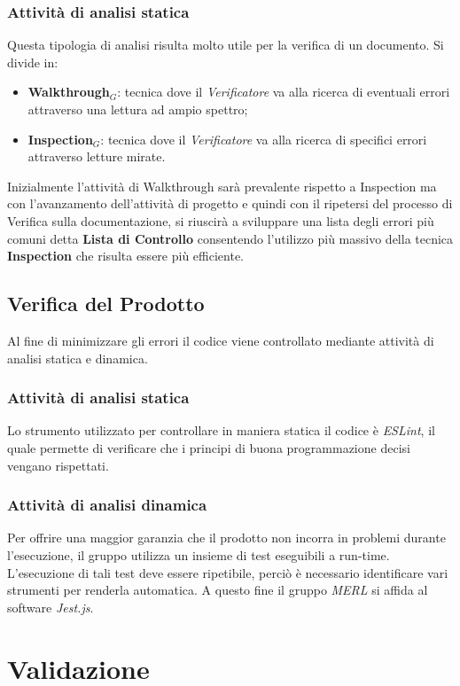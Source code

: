 \subsubsection{Attività di analisi statica}
Questa tipologia di analisi risulta molto utile per la verifica di un documento. Si divide in:
\begin{itemize}
  \item \textbf{Walkthrough}$_G$: tecnica dove il \textit{Verificatore} va alla ricerca di eventuali errori attraverso una lettura ad ampio spettro;
  \item \textbf{Inspection}$_G$: tecnica dove il \textit{Verificatore} va alla ricerca di specifici errori attraverso letture mirate.
\end{itemize}
Inizialmente l'attività di Walkthrough sarà prevalente rispetto a Inspection ma
con l'avanzamento dell'attività di progetto e quindi con il ripetersi del processo di Verifica sulla documentazione, si riuscirà a sviluppare una lista degli errori più comuni detta \textbf{Lista di Controllo} consentendo l'utilizzo più massivo della tecnica \textbf{Inspection} che risulta essere più efficiente.

\subsection{Verifica del Prodotto}
Al fine di minimizzare gli errori il codice viene controllato mediante attività di analisi statica e dinamica.

\subsubsection{Attività di analisi statica}
Lo strumento utilizzato per controllare in maniera statica il codice è \textit{ESLint}, il quale permette di verificare che i principi di buona programmazione decisi vengano rispettati.

\subsubsection{Attività di analisi dinamica}
Per offrire una maggior garanzia che il prodotto non incorra in problemi durante l'esecuzione, il gruppo utilizza un insieme di test eseguibili a run-time. L'esecuzione di tali test deve essere ripetibile, perciò è necessario identificare vari strumenti per renderla automatica. A questo fine il gruppo \textit{MERL} si affida al software \textit{Jest.js}.

\section{Validazione}
